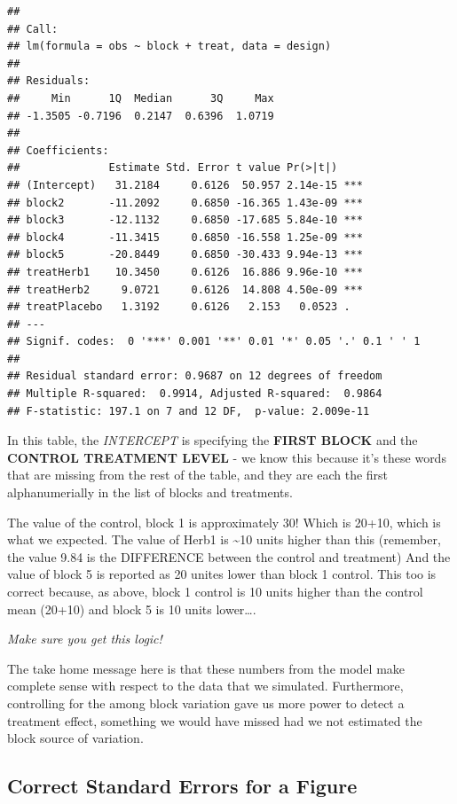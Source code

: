 \documentclass[
]{book}
\begin{document}
\begin{verbatim}
## 
## Call:
## lm(formula = obs ~ block + treat, data = design)
## 
## Residuals:
##     Min      1Q  Median      3Q     Max 
## -1.3505 -0.7196  0.2147  0.6396  1.0719 
## 
## Coefficients:
##              Estimate Std. Error t value Pr(>|t|)    
## (Intercept)   31.2184     0.6126  50.957 2.14e-15 ***
## block2       -11.2092     0.6850 -16.365 1.43e-09 ***
## block3       -12.1132     0.6850 -17.685 5.84e-10 ***
## block4       -11.3415     0.6850 -16.558 1.25e-09 ***
## block5       -20.8449     0.6850 -30.433 9.94e-13 ***
## treatHerb1    10.3450     0.6126  16.886 9.96e-10 ***
## treatHerb2     9.0721     0.6126  14.808 4.50e-09 ***
## treatPlacebo   1.3192     0.6126   2.153   0.0523 .  
## ---
## Signif. codes:  0 '***' 0.001 '**' 0.01 '*' 0.05 '.' 0.1 ' ' 1
## 
## Residual standard error: 0.9687 on 12 degrees of freedom
## Multiple R-squared:  0.9914, Adjusted R-squared:  0.9864 
## F-statistic: 197.1 on 7 and 12 DF,  p-value: 2.009e-11
\end{verbatim}

In this table, the \emph{INTERCEPT} is specifying the \textbf{FIRST BLOCK} and the \textbf{CONTROL TREATMENT LEVEL} - we know this because it's these words that are missing from the rest of the table, and they are each the first alphanumerially in the list of blocks and treatments.

The value of the control, block 1 is approximately 30! Which is 20+10, which is what we expected.
The value of Herb1 is \textasciitilde10 units higher than this (remember, the value 9.84 is the DIFFERENCE between the control and treatment)
And the value of block 5 is reported as 20 unites lower than block 1 control. This too is correct because, as above, block 1 control is 10 units higher than the control mean (20+10) and block 5 is 10 units lower\ldots.

\emph{Make sure you get this logic!}

The take home message here is that these numbers from the model make complete sense with respect to the data that we simulated. Furthermore, controlling for the among block variation gave us more power to detect a treatment effect, something we would have missed had we not estimated the block source of variation.

\hypertarget{correct-standard-errors-for-a-figure}{%
\subsection{Correct Standard Errors for a Figure}\label{correct-standard-errors-for-a-figure}}
\end{document}
